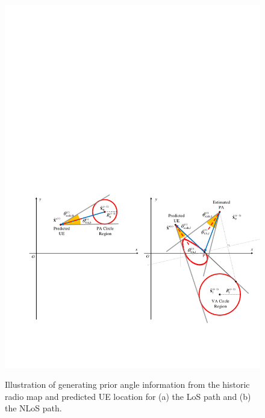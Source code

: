 \documentclass[journal,12pt,onecolumn,draftclsnofoot,]{IEEEtran}
\begin{document}
\begin{figure}
{\includegraphics[scale=0.7]{5-2.pdf}
}
\caption{Illustration of generating prior angle information from the historic radio map and predicted UE location for (a) the LoS path and (b) the NLoS path.}
\label{e}%
\vspace{-6mm}
\end{figure}
\end{document}

